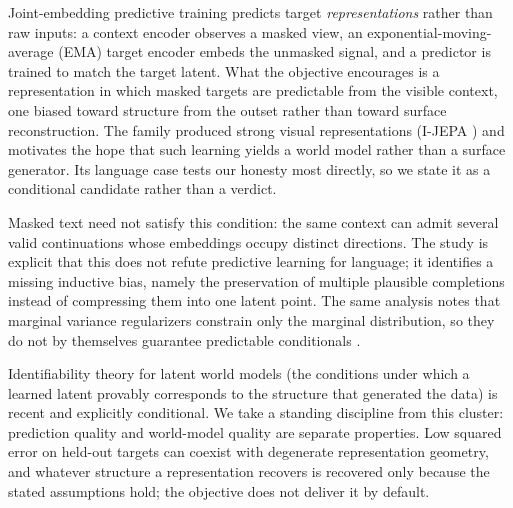 Joint-embedding predictive training predicts target \emph{representations} rather than raw
inputs: a context encoder observes a masked view, an exponential-moving-average (EMA) target
encoder embeds the unmasked signal, and a predictor is trained to match the target latent. What
the objective encourages is a representation in which masked targets are predictable from the
visible context, one biased toward structure from the outset rather than toward surface
reconstruction. The family produced strong visual representations (I-JEPA \cite{id230108243})
and motivates the hope that such learning yields a world model rather than a surface generator.
Its language case tests our honesty most directly, so we state it as a conditional candidate
rather than a verdict.

 Masked text need not satisfy
this condition: the same context can admit several valid continuations whose embeddings occupy
distinct directions.  The
study is explicit that this does not refute predictive learning for language; it identifies a
missing inductive bias, namely the preservation of multiple plausible completions instead of
compressing them into one latent point. The same analysis notes that marginal variance
regularizers constrain only the marginal distribution, so they do not by themselves guarantee
predictable conditionals \cite{id260723531}.

Identifiability theory for latent world models (the conditions under which a learned latent
provably corresponds to the structure that generated the data) is recent and explicitly
conditional.  We take a standing
discipline from this cluster: prediction quality and world-model quality are separate
properties. Low squared error on held-out targets can coexist with degenerate representation
geometry, and whatever structure a representation recovers is recovered only because the stated
assumptions hold; the objective does not deliver it by default.

